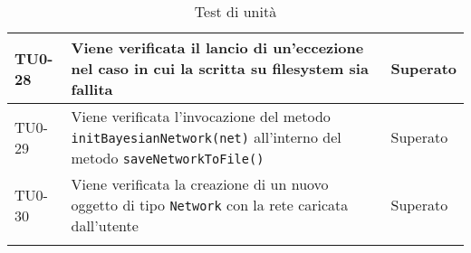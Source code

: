 \begin{longtable}{|C{.15\textwidth}|m{.65\textwidth}|C{.20\textwidth}|}
\hline 
 TU0-28 & Viene verificata il lancio di un'eccezione nel caso in cui la scritta su filesystem sia fallita & Superato \\ 
\hline 
{}TU0-29 & Viene verificata l'invocazione del metodo \texttt{initBayesianNetwork(net)} all'interno del metodo \texttt{saveNetworkToFile()} & Superato \\ 
\hline 
TU0-30 & Viene verificata la creazione di un nuovo oggetto di tipo \texttt{Network} con la rete caricata dall'utente & Superato \\ 
\hline












\caption{Test di unità}
\label{testunita}
\end{longtable}
